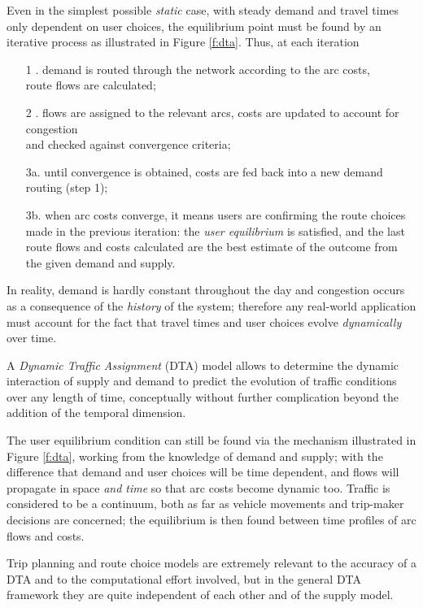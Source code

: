 Even in the simplest possible \emph{static} case, with steady demand and travel times only dependent on user choices, the equilibrium point must be found by an iterative process as illustrated in Figure \ref{f:dta}. Thus, at each iteration 
\begin{enumerate}
\item[1 .] demand is routed through the network according to the arc costs, \\
route flows are calculated;
\item[2 .] flows are assigned to the relevant arcs, costs are updated to account for congestion\\ and checked against convergence criteria;
\item[3a.] until convergence is obtained, costs are fed back into a new demand routing (step 1);
\item[3b.] when arc costs converge, it means users are confirming the route choices made in the previous iteration: the \emph{user equilibrium} is satisfied, and the last route flows and costs calculated are the best estimate of the outcome from the given demand and supply.
\end{enumerate} 

In reality, demand is hardly constant throughout the day and congestion occurs as a consequence of the \emph{history} of the system; therefore any real-world application must account for the fact that travel times and user choices evolve \emph{dynamically} over time.

A \emph{Dynamic Traffic Assignment} (DTA) model allows to determine the dynamic interaction of supply and demand to predict the evolution of traffic conditions over any length of time, conceptually without further complication beyond the addition of the temporal dimension.

The user equilibrium condition can still be found via the mechanism illustrated in Figure \ref{f:dta}, working from the knowledge of demand and supply; with the difference that demand and user choices will be time dependent, and flows will propagate in space \emph{and time} so that arc costs become dynamic too. Traffic is considered to be a continuum, both as far as vehicle movements and trip-maker decisions are concerned; the equilibrium is then found between time profiles of arc flows and costs.

Trip planning and route choice models are extremely relevant to the accuracy of a DTA and to the computational effort involved, but in the general DTA framework they are quite independent of each other and of the supply model.

